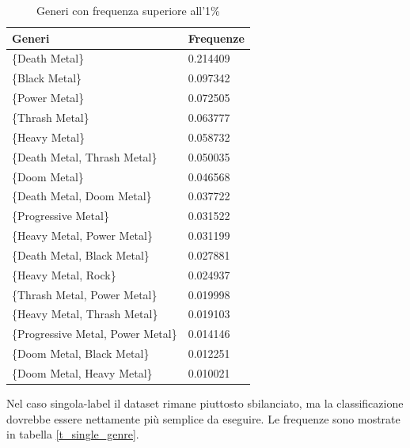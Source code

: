 \documentclass[technote]{IEEEtran}
\begin{document}
\begin{table}[H]
\centering
\caption{Generi con frequenza superiore all'1\%}
\begin{tabular}{|l|l|}
\hline
\textbf{Generi}                    & \textbf{Frequenze} \\ \hline
\{Death Metal\}                    & 0.214409           \\ \hline
\{Black Metal\}                    & 0.097342           \\ \hline
\{Power Metal\}                    & 0.072505           \\ \hline
\{Thrash Metal\}                   & 0.063777           \\ \hline
\{Heavy Metal\}                    & 0.058732           \\ \hline
\{Death Metal, Thrash Metal\}      & 0.050035           \\ \hline
\{Doom Metal\}                     & 0.046568           \\ \hline
\{Death Metal, Doom Metal\}        & 0.037722           \\ \hline
\{Progressive Metal\}              & 0.031522           \\ \hline
\{Heavy Metal, Power Metal\}       & 0.031199           \\ \hline
\{Death Metal, Black Metal\}       & 0.027881           \\ \hline
\{Heavy Metal, Rock\}              & 0.024937           \\ \hline
\{Thrash Metal, Power Metal\}      & 0.019998           \\ \hline
\{Heavy Metal, Thrash Metal\}      & 0.019103           \\ \hline
\{Progressive Metal, Power Metal\} & 0.014146           \\ \hline
\{Doom Metal, Black Metal\}        & 0.012251           \\ \hline
\{Doom Metal, Heavy Metal\}        & 0.010021           \\ \hline
\end{tabular}
\label{t_multi_genres}
\end{table}
Nel caso singola-label il dataset rimane piuttosto sbilanciato, ma la classificazione dovrebbe essere nettamente più semplice da eseguire. Le frequenze sono mostrate in tabella \ref{t_single_genre}.
\end{document}

